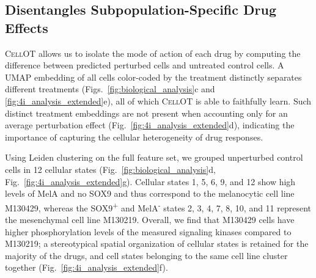 \subsection{Disentangles Subpopulation-Specific Drug Effects}
\textsc{CellOT} allows us to 
isolate the mode of action of each drug by computing the difference between predicted perturbed cells and untreated control cells. %
A UMAP embedding of all cells color-coded by the treatment distinctly separates different treatments (Figs.~\ref{fig:biological_analysis}c and \ref{fig:4i_analysis_extended}e), all of which \textsc{CellOT} is able to faithfully learn.
Such distinct treatment embeddings are not present when accounting only for an average perturbation effect (Fig.~\ref{fig:4i_analysis_extended}d), indicating the importance of capturing the cellular heterogeneity of drug responses.

 Using Leiden clustering on the full feature set, we grouped unperturbed control cells in 12 cellular states (Fig.~\ref{fig:biological_analysis}d, Fig.~\ref{fig:4i_analysis_extended}g). Cellular states 1, 5, 6, 9, and 12 show high levels of MelA and no SOX9 and thus correspond to the melanocytic cell line M130429, whereas the SOX9\textsuperscript{+} and MelA\textsuperscript{-} states 2, 3, 4, 7, 8, 10, and 11 represent the mesenchymal cell line M130219. Overall, we find that M130429 cells have higher phosphorylation levels of the measured signaling kinases compared to M130219;
a stereotypical spatial organization of cellular states is retained for the majority of the drugs,  and cell states belonging to the same cell line cluster together (Fig.~\ref{fig:4i_analysis_extended}f). 

